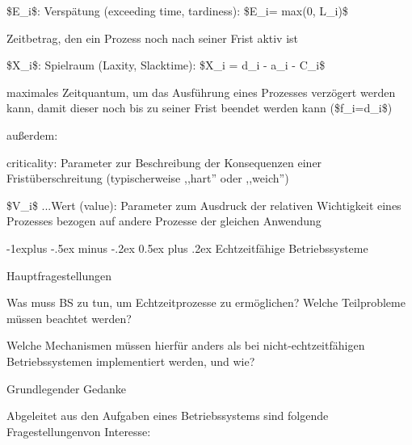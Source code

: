 \documentclass[a4paper]{article}
\makeatletter
\renewcommand{\subsection}{\@startsection{subsection}{2}{0mm}%
 {-1explus -.5ex minus -.2ex}%
 {0.5ex plus .2ex}%
 {\normalfont\normalsize\bfseries}}
\makeatother
\begin{document}
\begin{multicols}{3}
\begin{itemize*}
\begin{itemize*}
        \end{itemize*}
        \item
        \$E\_i\$: Verspätung (exceeding time, tardiness): \$E\_i= max(0,
        L\_i)\$
        \begin{itemize*}
            \item Zeitbetrag, den ein Prozess noch nach seiner Frist aktiv ist
        \end{itemize*}
        \item
        \item
        \$X\_i\$: Spielraum (Laxity, Slacktime): \$X\_i = d\_i - a\_i - C\_i\$
        \begin{itemize*}
            \item maximales Zeitquantum, um das Ausführung eines Prozesses verzögert werden kann, damit dieser noch bis zu seiner Frist beendet werden kann (\$f\_i=d\_i\$)
        \end{itemize*}
        \item
        außerdem:
        \begin{itemize*}
            \item criticality: Parameter zur Beschreibung der Konsequenzen einer Fristüberschreitung (typischerweise ,,hart'' oder ,,weich'')
            \item \$V\_i\$ ...Wert (value): Parameter zum Ausdruck der relativen Wichtigkeit eines Prozesses bezogen auf andere Prozesse der gleichen Anwendung
        \end{itemize*}
    \end{itemize*}


    \subsection{Echtzeitfähige
        Betriebssysteme}

    \begin{itemize*}
        \item
        Hauptfragestellungen
        \begin{enumerate*}

            \item Was muss BS zu tun, um Echtzeitprozesse zu ermöglichen? Welche Teilprobleme müssen beachtet werden?
            \item Welche Mechanismen müssen hierfür anders als bei nicht-echtzeitfähigen Betriebssystemen implementiert werden, und wie?
        \end{enumerate*}
        \item
        Grundlegender Gedanke
        \begin{itemize*}
            \item Abgeleitet aus den Aufgaben eines Betriebssystems sind folgende Fragestellungenvon Interesse:
        \end{itemize*}
        \begin{enumerate*}


\end{enumerate*}
\end{itemize*}
\end{multicols}
\end{document}
